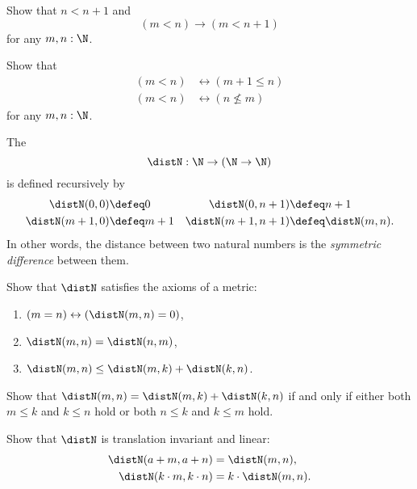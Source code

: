 \begin{exercises}
\begin{subexenum}
\begin{enumerate}
    \end{enumerate}
  \item Show that $n<n+1$ and
    \begin{equation*}
      (m<n)\to (m<n+1)
    \end{equation*}
    for any $m,n:\N$.
  \item \label{ex:contradiction-le}Show that
    \begin{align*}
      (m<n) & \leftrightarrow (m+1\leq n) \\
      (m<n) & \leftrightarrow (n \nleq m)
    \end{align*}
    for any $m,n :\N$.
  \end{subexenum}
  \exitem \label{ex:distN}The 
  \begin{equation*}
    \distN : \N \to (\N \to \N)
  \end{equation*}
  is defined recursively by
  \begin{align*}
    \distN(0,0) & \defeq 0 & \distN(0,n+1) & \defeq n+1 \\
    \distN(m+1,0) & \defeq m+1 & \distN(m+1,n+1) & \defeq \distN(m,n).
  \end{align*}
  In other words, the distance between two natural numbers is the \emph{symmetric difference} between them.
  \begin{subexenum}
  \item \label{ex:is-metric-distN}Show that $\distN$ satisfies the axioms of a metric:
    \begin{enumerate}
    \item $(m=n)\leftrightarrow (\distN(m,n)=0)$,
    \item $\distN(m,n) = \distN(n,m)$,
    \item $\distN(m,n) \leq\distN(m,k)+\distN(k,n)$.
    \end{enumerate}
  \item \label{ex:distN-triangle-equality}Show that $\distN(m,n)=\distN(m,k)+\distN(k,n)$ if and only if either both $m\leq k$ and $k\leq n$ hold or both $n\leq k$ and $k\leq m$ hold.
  \item \label{ex:translation-invariant-distN}Show that $\distN$ is translation invariant and linear:
    \begin{align*}
      \distN(a+m,a+n) & = \distN(m,n),\\
      \distN(k\cdot m,k\cdot n) & =k\cdot\distN(m,n).

\end{align*}
\end{subexenum}
\end{exercises}
